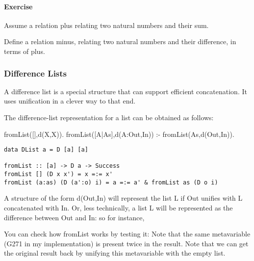 \documentclass{article}
\newcommand{\percents}[1]{\protect \marginpar[l]{\bf [#1]}}
\newcounter{question}
\newcommand{\question}[1]{
  \addtocounter{question}{1}
  \paragraph{Exercise~\arabic{question}  \percents{#1}}
 }
\newenvironment{ex}[1]{\question{#1}}{\vspace{1em}}
\begin{document}
\begin{ex}{*}
  Assume a relation \textsf{plus} relating two natural numbers and
  their sum.

  Define a relation \textsf{minus}, relating two natural numbers and
  their difference, in terms of \textsf{plus}.
\end{ex}

\subsubsection{Difference Lists}

A difference list is a special structure that can support efficient
concatenation. It uses unification in a clever way to that end.

The difference-list representation for a list can be obtained as follows:

\Prolog{}
\begin{prolog}
fromList([],d(X,X)).
fromList([A|As],d(A:Out,In)) :- fromList(As,d(Out,In)).
\end{prolog}


\Curry{}
\begin{verbatim}
data DList a = D [a] [a]

fromList :: [a] -> D a -> Success
fromList [] (D x x') = x =:= x'
fromList (a:as) (D (a':o) i) = a =:= a' & fromList as (D o i)
\end{verbatim}


A structure of the form \textsf{d(Out,In)} will represent the list
\textsf{L} if \textsf{Out} unifies with \textsf{L} concatenated with
\textsf{In}. Or, less technically, a list L will be represented as the
difference between Out and In: so for instance,



You can check how fromList works by testing it:
Note that the same metavariable (G271 in my implementation) is present twice in
the result. Note that we can get the original result back by unifying this
metavariable with the empty list.
\end{document}
